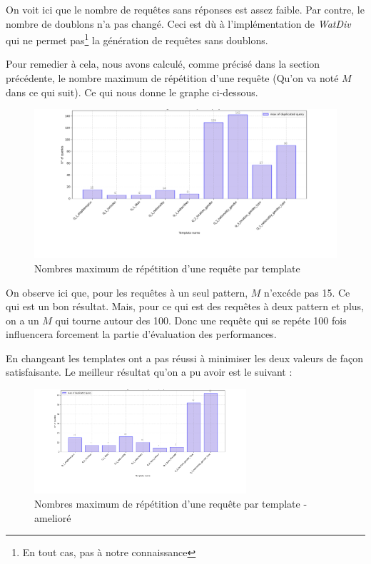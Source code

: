 \documentclass[12pt,titlepage]{article}
\begin{document}
On voit ici que le nombre de requêtes sans réponses est assez faible. Par contre, le nombre de doublons n'a pas changé. Ceci est dù à l'implémentation de \textit{WatDiv} qui ne permet pas\footnote{En tout cas, pas à notre connaissance} la génération de requêtes sans doublons.

Pour remedier à cela, nous avons calculé, comme précisé dans la section précédente, le nombre maximum de répétition d'une requête (Qu'on va noté $M$ dans ce qui suit). Ce qui nous donne le graphe ci-dessous.

\begin{figure}[!h]
  \centering
  \includegraphics[width=1.\textwidth]{img/max_dup.png}
  \caption{Nombres maximum de répétition d'une requête par template}
  \label{maxdup}
\end{figure}

On observe ici que, pour les requêtes à un seul pattern, $M$ n'excéde pas 15. Ce qui est un bon résultat. Mais, pour ce qui est des requêtes à deux pattern et plus, on a un $M$ qui tourne autour des 100. Donc une requête qui se repéte 100 fois influencera forcement la partie d'évaluation des performances.

En changeant les templates ont a pas réussi à minimiser les deux valeurs de façon satisfaisante. Le meilleur résultat qu'on a pu avoir est le suivant :

\begin{figure}[!h]
  \centering
  \includegraphics[width=0.70\textwidth]{img/max_dup_final.png}
  \caption{Nombres maximum de répétition d'une requête par template - amelioré}
  \label{maxdupfinal}
\end{figure}
\end{document}
